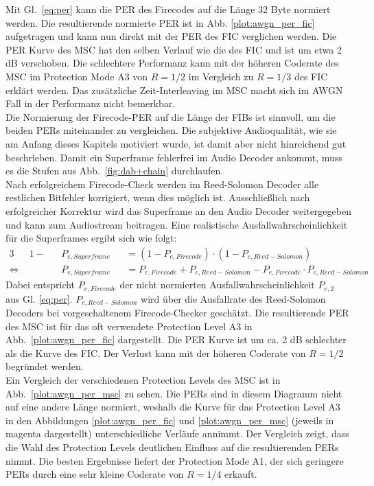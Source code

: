 Mit Gl.~\ref{eq:per} kann die PER des Firecodes auf die Länge $32$ Byte normiert werden. Die resultierende normierte PER ist in Abb. \ref{plot:awgn_per_fic} aufgetragen und kann nun direkt mit der PER des FIC verglichen werden. Die PER Kurve des MSC hat den selben Verlauf wie die des FIC und ist um etwa 2 dB verschoben. Die schlechtere Performanz kann mit der höheren Coderate des MSC im Protection Mode A3 von $R=1/2$ im Vergleich zu $R=1/3$ des FIC erklärt werden. Das zusätzliche Zeit-Interleaving im MSC macht sich im AWGN Fall in der Performanz nicht bemerkbar.\\

Die Normierung der Firecode-PER auf die Länge der FIBs ist sinnvoll, um die beiden PERs miteinander zu vergleichen. Die subjektive Audioqualität, wie sie am Anfang dieses Kapitels motiviert wurde, ist damit aber nicht hinreichend gut beschrieben. Damit ein Superframe fehlerfrei im Audio Decoder ankommt, muss es die Stufen aus Abb.~\ref{fig:dab+chain} durchlaufen.\\
Nach erfolgreichem Firecode-Check werden im Reed-Solomon Decoder alle restlichen Bitfehler korrigiert, wenn dies möglich ist. Ausschließlich nach erfolgreicher Korrektur wird das Superframe an den Audio Decoder weitergegeben und kann zum Audiostream beitragen. Eine realistische Ausfallwahrscheinlichkeit für die Superframes ergibt sich wie folgt:
\begin{alignat}{3}
&1-&&P_{e,Superframe} &&= (1-P_{e,Firecode}) \cdot (1-P_{e, Reed-Solomon})\nonumber \\
\Leftrightarrow\; & &&P_{e, Superframe} &&= P_{e,Firecode} + P_{e, Reed-Solomon} - P_{e,Firecode}\cdot P_{e, Reed-Solomon}
\label{eq:per_superframe}
\end{alignat}
Dabei entspricht $P_{e,Firecode}$ der nicht normierten Ausfallwahrscheinlichkeit $P_{e,2}$ aus Gl. \ref{eq:per}. $P_{e,Reed-Solomon}$ wird über die Ausfallrate des Reed-Solomon Decoders bei vorgeschaltenem Firecode-Checker geschätzt. Die resultierende PER des MSC ist für das oft verwendete Protection Level A3 in Abb.~\ref{plot:awgn_per_fic} dargestellt. Die PER Kurve ist um ca. 2 dB schlechter als die Kurve des FIC. Der Verlust kann mit der höheren Coderate von $R=1/2$ begründet werden.\\

Ein Vergleich der verschiedenen Protection Levels des MSC ist in Abb.~\ref{plot:awgn_per_msc} zu sehen. Die PERs sind in diesem Diagramm nicht auf eine andere Länge normiert, weshalb die Kurve für das Protection Level A3 in den Abbildungen \ref{plot:awgn_per_fic} und \ref{plot:awgn_per_msc} (jeweils in magenta dargestellt) unterschiedliche Verläufe annimmt. Der Vergleich zeigt, dass die Wahl des Protection Levels deutlichen Einfluss auf die resultierenden PERs nimmt. Die besten Ergebnisse liefert der Protection Mode A1, der sich geringere PERs durch eine sehr kleine Coderate von $R=1/4$ erkauft.

